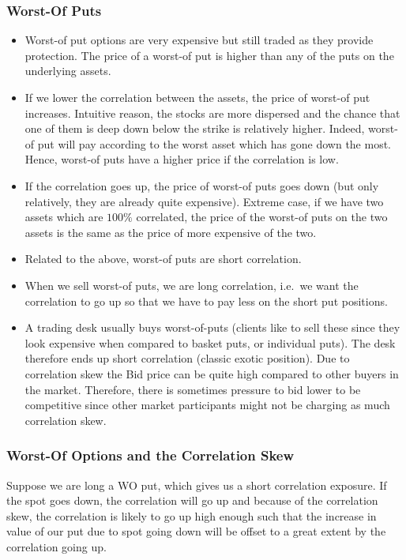 \documentclass{amsart}
\theoremstyle{plain}
\numberwithin{equation}{section}
\begin{document}
\subsubsection{Worst-Of Puts}
\begin{itemize}
	\item Worst-of put options are very expensive but still traded as they provide protection. The price 
				of a worst-of put is higher than any of the puts on the underlying assets. 
			  
	\item If we lower the correlation between the assets, the price of worst-of put
			  increases. Intuitive reason, the stocks are more dispersed and the chance that one 
				of them is deep down below the strike is relatively higher. Indeed, worst-of put will 
				pay according to the worst asset which has gone down the most. Hence, worst-of puts have a
				higher price if the correlation is low.
				
	\item If the correlation goes up, the price of worst-of puts goes down (but only relatively, they are 
				already quite expensive). Extreme case, if
				we have two assets which are $100\%$ correlated, the price of the worst-of puts on the 
				two assets is the same as the price of more expensive of the two.
				
	\item Related to the above, worst-of puts are short correlation.
	\item When we sell worst-of puts, we are long correlation, i.e.\ we want the 
			  correlation to go up so that we have to pay less on the short put positions. 
							
	\item A trading desk usually buys worst-of-puts (clients like to sell these since they look expensive when compared 
	to basket puts, or individual puts). The desk therefore ends up short correlation (classic exotic position). Due to 
	correlation skew the Bid price can be quite high compared to other buyers in the market. Therefore, there is sometimes pressure to bid 
lower to be competitive since other market participants might not be charging as much correlation skew.
\end{itemize}

\subsubsection{Worst-Of Options and the Correlation Skew}
Suppose we are long a WO put, which gives us a 
short correlation exposure. If the spot goes down,
the correlation will go up and because of the correlation 
skew, the correlation is likely to go up high enough 
such that the increase in value
of our put due to spot going down will be offset 
to a great extent by the correlation going up. 
\end{document}
